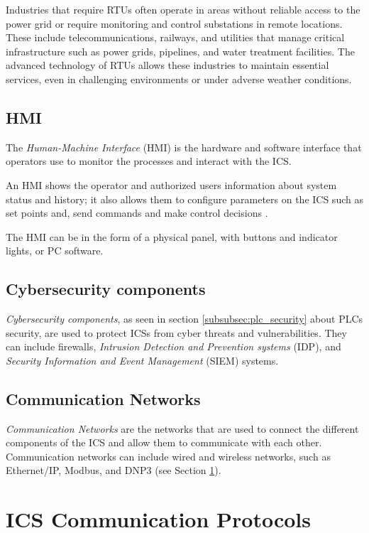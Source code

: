 \bigskip
Industries that require RTUs often operate in areas without reliable access to the power grid or require monitoring and control substations in remote locations. These include telecommunications, railways, and utilities that manage critical infrastructure such as power grids, pipelines, and water treatment facilities. The advanced technology of RTUs allows these industries to maintain essential services, even in challenging environments or under adverse weather conditions.

\subsection{HMI}
\label{subsec:hmi}
The \textit{Human-Machine Interface} (HMI) is the hardware and software interface that operators use to monitor the processes and interact with the ICS. 

An HMI shows the operator and authorized users information about system status and history; it also allows them to configure parameters on the ICS such as set points and, send commands and make control decisions \cite{hmi_definition}.

The HMI can be in the form of a physical panel, with buttons and indicator lights, or PC software.

\subsection{Cybersecurity components}
\textit{Cybersecurity components}, as seen in section \ref{subsubsec:plc_security} about PLCs security, are used to protect  ICSs from cyber threats and vulnerabilities. They can include firewalls, \textit{Intrusion Detection and Prevention systems} (IDP), and \textit{Security Information and Event Management} (SIEM) systems.

\subsection{Communication Networks}
\textit{Communication Networks} are the networks that are used to connect the different components of the ICS and allow them to communicate with each other. Communication networks can include wired and wireless networks, such as Ethernet/IP, Modbus, and DNP3 (see Section \ref{sec:ics_protocols}).

\section{ICS Communication Protocols}
\label{sec:ics_protocols}


